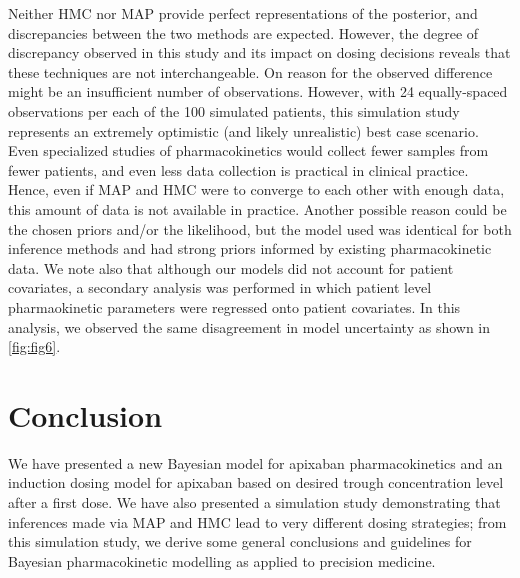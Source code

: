 Neither HMC nor MAP provide perfect representations of the posterior, and discrepancies between the two methods are expected. However, the degree of discrepancy observed in this study and its impact on dosing decisions reveals that these techniques are not interchangeable. On reason for the observed difference might be an insufficient number of observations.  However, with 24 equally-spaced observations per each of the 100 simulated patients, this simulation study represents an extremely optimistic (and likely unrealistic) best case scenario. Even specialized studies of pharmacokinetics would collect fewer samples from fewer patients, and even less data collection is practical in clinical practice. Hence, even if MAP and HMC were to converge to each other with enough data, this amount of data is not available in practice. Another possible reason could be the chosen priors and/or the likelihood, but the model used was identical for both inference methods and had strong priors informed by existing pharmacokinetic data.  We note also that although our models did not account for patient covariates, a secondary analysis was performed in which patient level pharmaokinetic parameters were regressed onto patient covariates.  In this analysis, we observed the same disagreement in model uncertainty as shown in \cref{fig:fig6}.


\section{Conclusion}
We have presented a new Bayesian model for apixaban pharmacokinetics and an induction dosing model for apixaban based on desired trough concentration level after a first dose. We have also presented a simulation study demonstrating that inferences made via MAP and HMC lead to very different dosing strategies; from this simulation study, we derive some general conclusions and guidelines for Bayesian pharmacokinetic modelling as applied to precision medicine.

